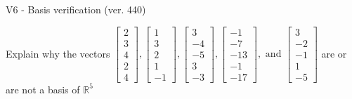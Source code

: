 \begin{exercise}
  \begin{exerciseTitle}V6 - Basis verification (ver. 440)\end{exerciseTitle}
  \begin{exerciseStatement}
    Explain why the vectors \(\left[\begin{array}{r}
2 \\
3 \\
4 \\
2 \\
4
\end{array}\right] , \left[\begin{array}{r}
1 \\
3 \\
2 \\
1 \\
-1
\end{array}\right] , \left[\begin{array}{r}
3 \\
-4 \\
-5 \\
3 \\
-3
\end{array}\right] , \left[\begin{array}{r}
-1 \\
-7 \\
-13 \\
-1 \\
-17
\end{array}\right] , \text{ and } \left[\begin{array}{r}
3 \\
-2 \\
-1 \\
1 \\
-5
\end{array}\right]\) are or are not a basis of \(\mathbb{R}^5\)	



\end{exerciseStatement}
\end{exercise}
